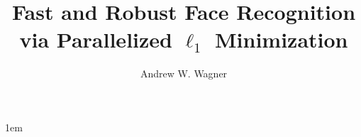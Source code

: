 \documentclass[draftthesis,tocnosub,noragright,centerchapter,12pt]{uiucecethesis09}
\title{Fast and Robust Face Recognition \\
		via Parallelized $\ell_1$ Minimization}
\author{Andrew W. Wagner}
\begin{document}

\maketitle

\parindent 1em%

\frontmatter

\begin{abstract}
 
\end{abstract}


%

\tableofcontents





\mainmatter









%
%

\backmatter



\end{document}
